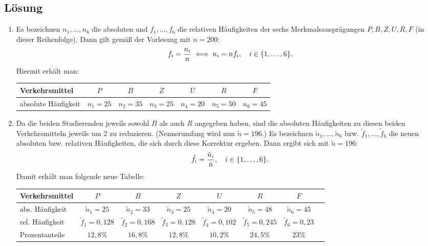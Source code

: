 \documentclass{exercise}
\begin{document}
    \subsection*{Lösung}
    \begin{enumerate}
        \item Es bezeichnen \(n_1, \ldots, n_6\) die absoluten und \(f_1, \ldots, f_6\) die relativen Häufigkeiten der sechs Merkmalsausprägungen \(P, B, Z, U, R, F\) (in dieser Reihenfolge).
        Dann gilt gemäß der Vorlesung mit \(n = 200\):
        \[
            f_i = \frac{n_i}{n} \iff n_i = nf_i, \quad i \in \braces*{1, \ldots, 6}.
        \]
        Hiermit erhält man:
        \begin{center}
            \begin{tabular}{lcccccc}
                \toprule
                Verkehrsmittel & \(P\) & \(B\) & \(Z\) & \(U\) & \(R\) & \(F\)\\
                \midrule
                absolute Häufigkeit & \(n_1 = 25\) & \(n_2 = 35\) & \(n_3 = 25\) & \(n_4 = 20\) & \(n_5 = 50\) & \(n_6 = 45\)\\
                \bottomrule
            \end{tabular}
        \end{center}
        \item Da die beiden Studierenden jeweils sowohl \(B\) als auch \(R\) angegeben haben, sind die absoluten Häufigkeiten zu diesen beiden Verkehrsmitteln jeweils um \(2\) zu reduzieren.
        (Nennerumfang wird nun \(\tilde{n} = 196\).)
        Es bezeichnen \(\tilde{n}_1, \ldots, \tilde{n}_6\) bzw. \(\tilde{f}_1, \ldots, \tilde{f}_6\) die neuen absoluten bzw. relativen Häufigkeiten, die sich durch diese Korrektur ergeben.
        Dann ergibt sich mit \(\tilde{n} = 196\):
        \[
            \tilde{f}_i = \frac{\tilde{n}_i}{\tilde{n}}, \quad i \in \braces*{1, \ldots, 6}.
        \]
        Damit erhält man folgende neue Tabelle:
        \begin{center}
            \begin{tabular}{lccccccc}
                \toprule
                Verkehrsmittel & \(P\) & \(B\) & \(Z\) & \(U\) & \(R\) & \(F\)\\
                \midrule
                abs. Häufigkeit & \(\tilde{n}_1 = 25\) & \(\tilde{n}_2 = 33\) & \(\tilde{n}_3 = 25\) & \(\tilde{n}_4 = 20\) & \(\tilde{n}_5 = 48\) & \(\tilde{n}_6 = 45\)\\
                rel. Häufigkeit & \(\tilde{f}_1 = 0,128\) & \(\tilde{f}_2 = 0,168\) & \(\tilde{f}_3 = 0,128\) & \(\tilde{f}_4 = 0,102\) & \(\tilde{f}_5 = 0,245\) & \(\tilde{f}_6 = 0,23\)\\
                Prozentanteile & \(12,8\%\) & \(16,8\%\) & \(12,8\%\) & \(10,2\%\) & \(24,5\%\) & \(23\%\)\\
                \bottomrule
            \end{tabular}
        \end{center}
    \end{enumerate}
\end{document}
